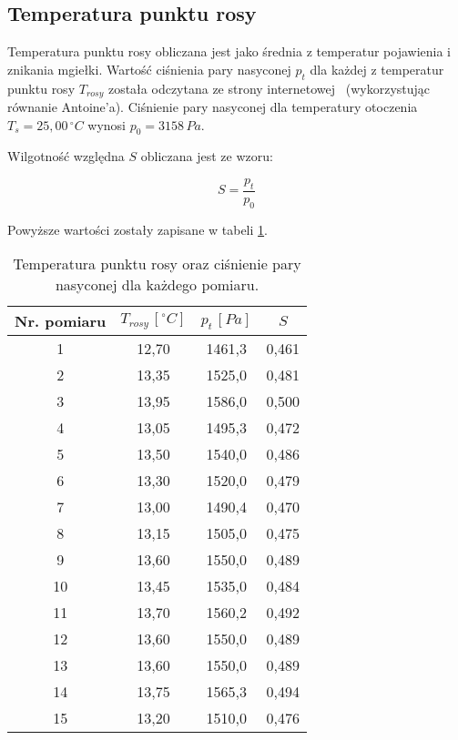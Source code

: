 \documentclass[a4paper,12pt]{article}
\begin{document}
\subsection{Temperatura punktu rosy}

Temperatura punktu rosy obliczana jest jako średnia z temperatur pojawienia i znikania mgiełki. Wartość ciśnienia pary nasyconej $p_t$ dla każdej z temperatur punktu rosy $T_{rosy}$ została odczytana ze strony internetowej~\cite{tabele} (wykorzystując równanie Antoine'a). Ciśnienie pary nasyconej dla temperatury otoczenia $T_s = 25{,}00\,^\circ C$ wynosi $p_0 = 3158\,Pa$.

Wilgotność względna $S$ obliczana jest ze wzoru:

\begin{equation}
    S= \frac{p_t}{p_0}
\end{equation}

Powyższe wartości zostały zapisane w tabeli \ref{tab:rosy}.

\begin{table}[H]
    \centering
    \begin{tabular}{|c|c|c|c|}
        \hline
        Nr. pomiaru & $T_{rosy}\,[^\circ C]$ & $p_t\,[Pa]$ & $S$ \\
        \hline
        1 & 12{,}70 & 1461{,}3 & 0{,}461 \\
        2 & 13{,}35 & 1525{,}0 & 0{,}481 \\
        3 & 13{,}95 & 1586{,}0 & 0{,}500 \\
        4 & 13{,}05 & 1495{,}3 & 0{,}472 \\
        5 & 13{,}50 & 1540{,}0 & 0{,}486 \\
        6 & 13{,}30 & 1520{,}0 & 0{,}479 \\
        7 & 13{,}00 & 1490{,}4 & 0{,}470 \\
        8 & 13{,}15 & 1505{,}0 & 0{,}475 \\
        9 & 13{,}60 & 1550{,}0 & 0{,}489 \\
        10 & 13{,}45 & 1535{,}0 & 0{,}484 \\
        11 & 13{,}70 & 1560{,}2 & 0{,}492 \\
        12 & 13{,}60 & 1550{,}0 & 0{,}489 \\
        13 & 13{,}60 & 1550{,}0 & 0{,}489 \\
        14 & 13{,}75 & 1565{,}3 & 0{,}494 \\
        15 & 13{,}20 & 1510{,}0 & 0{,}476 \\
        \hline
    \end{tabular}
    \caption{Temperatura punktu rosy oraz ciśnienie pary nasyconej dla każdego pomiaru.}
    \label{tab:rosy}
\end{table}
\end{document}
